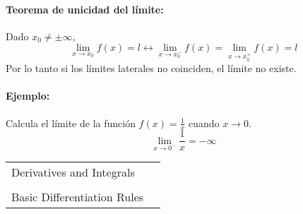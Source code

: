 \paragraph{Teorema de unicidad del límite:}
Dado $x_0\neq\pm\infty$,
$$\lim_{x \to x_0} f(x) = l \leftrightarrow \lim_{x \to x_0^-} f(x) = \lim_{x \to x_0^+} f(x)= l $$
Por lo tanto si los límites laterales no coinciden, el límite no existe.

\paragraph{Ejemplo:} Calcula el límite de la función $f(x)=\frac{1}{x}$ cuando $x \to 0$.\\
$$\lim_{x \to 0^-} \frac{1}{x} = -\infty$$



    \begin{tabular}{l l}
      Derivatives and Integrals \\
      \\

      Basic Differentiation Rules \\


\end{tabular}
